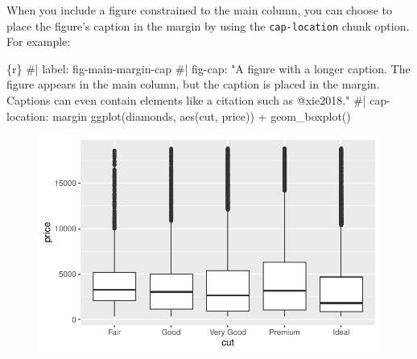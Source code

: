 \documentclass[
  letterpaper,
  DIV=11,
  numbers=noendperiod,
  oneside]{scrartcl}
\newenvironment{Shaded}{\begin{snugshade}}{\end{snugshade}}
\newcommand{\CommentTok}[1]{\textcolor[rgb]{0.37,0.37,0.37}{#1}}
\newcommand{\FunctionTok}[1]{\textcolor[rgb]{0.28,0.35,0.67}{#1}}
\newcommand{\InformationTok}[1]{\textcolor[rgb]{0.37,0.37,0.37}{#1}}
\newcommand{\NormalTok}[1]{\textcolor[rgb]{0.00,0.23,0.31}{#1}}
\newcommand{\SpecialCharTok}[1]{\textcolor[rgb]{0.37,0.37,0.37}{#1}}
\begin{document}
When you include a figure constrained to the main column, you can choose
to place the figure's caption in the margin by using the
\texttt{cap-location} chunk option. For example:

\begin{Shaded}
\begin{Highlighting}[]
\InformationTok{\textasciigrave{}\textasciigrave{}\textasciigrave{}\{r\}}
\CommentTok{\#| label: fig{-}main{-}margin{-}cap}
\CommentTok{\#| fig{-}cap: "A figure with a longer caption. The figure appears in the main column, but the caption is placed in the margin. Captions can even contain elements like a citation such as @xie2018."}
\CommentTok{\#| cap{-}location: margin}
\FunctionTok{ggplot}\NormalTok{(diamonds, }\FunctionTok{aes}\NormalTok{(cut, price)) }\SpecialCharTok{+} \FunctionTok{geom\_boxplot}\NormalTok{()}
\InformationTok{\textasciigrave{}\textasciigrave{}\textasciigrave{}}
\end{Highlighting}
\end{Shaded}

\begin{figure}[H]


{\centering \includegraphics{HousePrices_files/figure-pdf/fig-main-margin-cap-1.pdf}

}

\end{figure}
\end{document}
